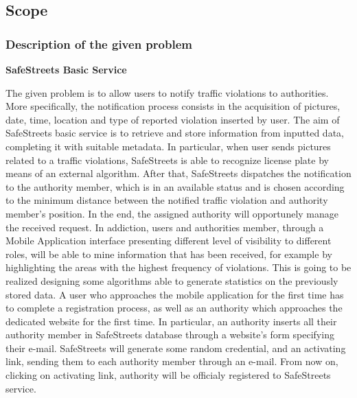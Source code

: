 \documentclass[12pt]{article}
\begin{document}
\subsection{Scope}
\vspace{5mm}
\subsubsection{Description of the given problem}
\vspace{2mm}
	
	\textbf{SafeStreets Basic Service}

\vspace{3mm}
The given problem is to allow users to notify traffic violations to authorities. More specifically, the notification process consists in the acquisition of pictures, date, time, location and type of reported violation inserted by user. The aim of SafeStreets basic service is to retrieve and store information from inputted data, completing it with suitable metadata.  In particular, when user sends pictures related to a traffic violations, SafeStreets is able to recognize license plate by means of an external algorithm. After that, SafeStreets dispatches the notification to the authority member, which is in an available status and is chosen according to the minimum distance between the notified traffic violation and authority member’s position. In the end, the assigned authority will opportunely manage the received request. In addiction, users and authorities member, through a Mobile Application interface presenting different level of visibility to different roles, will be able to mine information that has been received, for example by highlighting the areas with the highest frequency of violations. This is going to be realized designing some algorithms able to generate statistics on the previously stored data. A user who approaches the mobile application for the first time has to complete a registration process, as well as an authority which approaches the dedicated website for the first time. In particular, an authority inserts all their authority member in SafeStreets database through a website’s form specifying their e-mail. SafeStreets will generate some random credential, and an activating link, sending them to each authority member through an e-mail. From now on, clicking on activating link, authority will be officialy registered to SafeStreets service.

\vspace{5mm}
\end{document}
